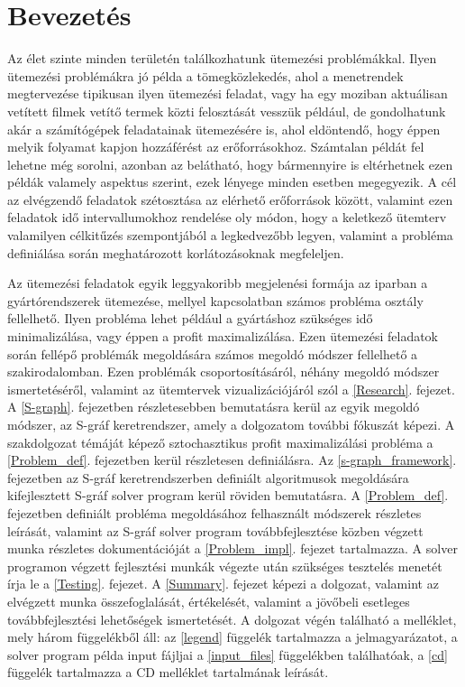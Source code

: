 \chapter{Bevezetés}
\setcounter{page}{1}
Az élet szinte minden területén találkozhatunk ütemezési problémákkal.
Ilyen ütemezési problémákra jó példa a tömegközlekedés, ahol a menetrendek megtervezése tipikusan ilyen ütemezési feladat, vagy ha egy moziban aktuálisan vetített filmek vetítő termek közti felosztását vesszük például, de gondolhatunk akár a számítógépek feladatainak ütemezésére is, ahol eldöntendő, hogy éppen melyik folyamat kapjon hozzáférést az erőforrásokhoz.
Számtalan példát fel lehetne még sorolni, azonban az belátható, hogy bármennyire is eltérhetnek ezen példák valamely aspektus szerint, ezek lényege minden esetben megegyezik.
A cél az elvégzendő feladatok szétosztása az elérhető erőforrások között, valamint ezen feladatok idő intervallumokhoz rendelése oly módon, hogy a keletkező ütemterv valamilyen célkitűzés szempontjából a legkedvezőbb legyen, valamint a probléma definiálása során meghatározott korlátozásoknak megfeleljen.

Az ütemezési feladatok egyik leggyakoribb megjelenési formája az iparban a gyártórendszerek ütemezése, mellyel kapcsolatban számos probléma osztály fellelhető.
Ilyen probléma lehet például a gyártáshoz szükséges idő minimalizálása, vagy éppen a profit maximalizálása. 
Ezen ütemezési feladatok során fellépő problémák megoldására számos megoldó módszer fellelhető a szakirodalomban.
Ezen problémák csoportosításáról, néhány megoldó módszer ismertetéséről, valamint az ütemtervek vizualizációjáról szól a \ref{Research}. fejezet.
A \ref{S-graph}. fejezetben részletesebben bemutatásra kerül az egyik megoldó módszer, az S-gráf keretrendszer, amely a dolgozatom további fókuszát képezi.
A szakdolgozat témáját képező sztochasztikus profit maximalizálási probléma a \ref {Problem_def}. fejezetben kerül részletesen definiálásra.
Az \ref{s-graph_framework}. fejezetben az S-gráf keretrendszerben definiált algoritmusok megoldására kifejlesztett S-gráf solver program kerül röviden bemutatásra.
A \ref{Problem_def}. fejezetben definiált probléma megoldásához felhasznált módszerek részletes leírását, valamint az S-gráf solver program továbbfejlesztése közben végzett munka részletes dokumentációját a \ref{Problem_impl}. fejezet tartalmazza.
A solver programon végzett fejlesztési munkák végezte után szükséges tesztelés menetét írja le a \ref{Testing}. fejezet.
A \ref{Summary}. fejezet képezi a dolgozat, valamint az elvégzett munka összefoglalását, értékelését, valamint a jövőbeli esetleges továbbfejlesztési lehetőségek ismertetését.
A dolgozat végén található a melléklet, mely három függelékből áll: az \ref{legend} függelék tartalmazza a jelmagyarázatot, a solver program példa input fájljai a \ref{input_files} függelékben találhatóak, a \ref{cd} függelék tartalmazza a CD melléklet tartalmának leírását.   